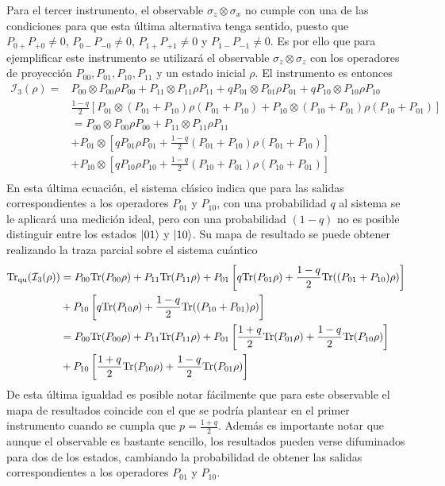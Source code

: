 Para el tercer instrumento, el observable $\sigma_z\otimes \sigma_x$ no cumple con una de las condiciones para que esta última alternativa tenga sentido, puesto que $P_{0+}P_{+0}\ne 0$,  $P_{0-}P_{-0}\ne 0$, $P_{1+}P_{+1}\ne 0$ y $P_{1-}P_{-1}\ne 0$. Es por ello que para ejemplificar este instrumento se utilizará el observable $\sigma_z\otimes \sigma_z$ con los operadores de proyección $P_{00},P_{01},P_{10},P_{11}$ y un estado inicial $\rho$. El instrumento es entonces \[\begin{split}\mathcal{I}_3(\rho)=&P_{00}\otimes P_{00}\rho P_{00}+P_{11}\otimes P_{11}\rho P_{11}+q P_{01}\otimes P_{01}\rho P_{01}+q P_{10}\otimes P_{10}\rho P_{10}\\
&\frac{1-q}{2}\left[P_{01}\otimes (P_{01}+P_{10})\rho(P_{01}+P_{10})+ P_{10}\otimes(P_{10}+P_{01})\rho (P_{10}+P_{01}) \right]\\
&=P_{00}\otimes P_{00}\rho P_{00}+P_{11}\otimes P_{11}\rho P_{11}\\
&+P_{01}\otimes \left[q P_{01}\rho P_{01}+\frac{1-q}{2}(P_{01}+P_{10})\rho(P_{01}+P_{10})\right]\\
&+P_{10}\otimes \left[q P_{10}\rho P_{10}+\frac{1-q}{2}(P_{10}+P_{01})\rho (P_{10}+P_{01}) \right]\\
 \end{split}\] En esta última ecuación, el sistema clásico indica que para las salidas correspondientes a los operadores $ P_{01}$ y $P_{10}$, con una probabilidad $q$ al sistema se le aplicará una medición ideal, pero con una probabilidad $(1-q)$ no es posible distinguir entre los estados $|01\rangle$ y $|10\rangle$. Su mapa de resultado se puede obtener realizando la traza parcial sobre el sistema cuántico \[\begin{split}{\rm Tr}_{\text{qu}}(\mathcal{I}_3(\rho)) &=P_{00} {\rm Tr}(P_{00}\rho)+P_{11}{\rm Tr}(P_{11}\rho)+P_{01}\left[q {\rm Tr}(P_{01}\rho)+\frac{1-q}{2}{\rm Tr}((P_{01}+P_{10})\rho)\right]\\
    &+P_{10} \left[q {\rm Tr}(P_{10}\rho)+\frac{1-q}{2}{\rm Tr}((P_{10}+P_{01})\rho)\right]\\
    &=P_{00} {\rm Tr}(P_{00}\rho)+P_{11}{\rm Tr}(P_{11}\rho)+P_{01}\left[\frac{1+q}{2} {\rm Tr}(P_{01}\rho)+\frac{1-q}{2}{\rm Tr}(P_{10}\rho)\right]\\
    &+P_{10} \left[\frac{1+q}{2} {\rm Tr}(P_{10}\rho)+\frac{1-q}{2}{\rm Tr}(P_{01}\rho)\right]\\
     \end{split}\] De esta última igualdad es posible notar fácilmente que para este observable el mapa de resultados coincide con el que se podría plantear en el primer instrumento cuando se cumpla que $p=\frac{1+q}{2}$. Además es importante notar que aunque el observable es bastante sencillo, los resultados pueden verse difuminados para dos de los estados, cambiando la probabilidad de obtener las salidas correspondientes a los operadores $P_{01}$ y $P_{10}$.


